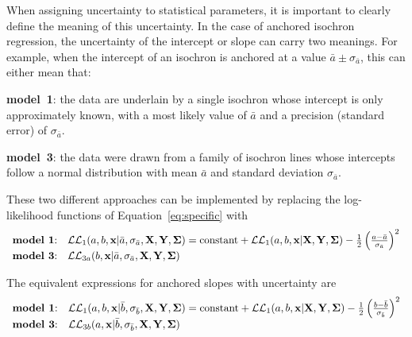 \documentclass{article}
\begin{document}
When assigning uncertainty to statistical parameters, it is important
to clearly define the meaning of this uncertainty. In the case of
anchored isochron regression, the uncertainty of the intercept or
slope can carry two meanings. For example, when the intercept of an
isochron is anchored at a value $\bar{a} \pm \sigma_{\bar{a}}$, this
can either mean that:

\begin{description}
\item{\textbf{model~1}:} the data are underlain by a single isochron
  whose intercept is only approximately known, with a most likely
  value of $\bar{a}$ and a precision (standard error) of
  $\sigma_{\bar{a}}$.
\item{\textbf{model~3}:} the data were drawn from a family of isochron
  lines whose intercepts follow a normal distribution with mean
  $\bar{a}$ and standard deviation $\sigma_{\bar{a}}$.
\end{description}

These two different approaches can be implemented by replacing the
log-likelihood functions of Equation~\ref{eq:specific} with
\begin{equation}
  \begin{array}{ll}
    \mbox{\textbf{model~1}:} &
    \mathcal{LL}_1(a,b,\mathbf{x}|\bar{a},\sigma_{\bar{a}},\mathbf{X},\mathbf{Y},\mathbf{\Sigma}) =
    \mbox{constant} +
    \mathcal{LL}_1(a,b,\mathbf{x}|\mathbf{X},\mathbf{Y},\mathbf{\Sigma}) -
    \frac{1}{2} \left(\frac{a-\bar{a}}{\sigma_{\bar{a}}}\right)^2 \\
    \mbox{\textbf{model~3}:} &
    \mathcal{LL}_{3a}(b,\mathbf{x}|\bar{a},\sigma_{\bar{a}},\mathbf{X},\mathbf{Y},\mathbf{\Sigma})
  \end{array}
  \label{eq:aerr}
\end{equation}

The equivalent expressions for anchored slopes with uncertainty are
\begin{equation}
  \begin{array}{ll}
    \mbox{\textbf{model~1}:} &
    \mathcal{LL}_1(a,b,\mathbf{x}|\bar{b},\sigma_{\bar{b}},\mathbf{X},\mathbf{Y},\mathbf{\Sigma}) =
    \mbox{constant} +
    \mathcal{LL}_1(a,b,\mathbf{x}|\mathbf{X},\mathbf{Y},\mathbf{\Sigma}) -
    \frac{1}{2} \left(\frac{b-\bar{b}}{\sigma_{\bar{b}}}\right)^2 \\
    \mbox{\textbf{model~3}:} &
    \mathcal{LL}_{3b}(a,\mathbf{x}|\bar{b},\sigma_{\bar{b}},\mathbf{X},\mathbf{Y},\mathbf{\Sigma})
  \end{array}
  \label{eq:berr}
\end{equation}
\end{document}
